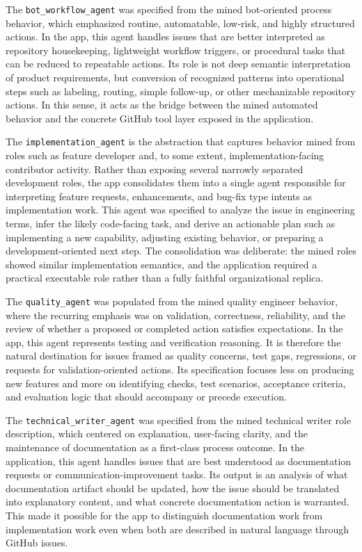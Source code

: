 \documentclass[11pt,a4paper]{article}
\begin{document}
The \texttt{bot\_workflow\_agent} was specified from the mined bot-oriented process behavior, which emphasized routine, automatable, low-risk, and highly structured actions. In the app, this agent handles issues that are better interpreted as repository housekeeping, lightweight workflow triggers, or procedural tasks that can be reduced to repeatable actions. Its role is not deep semantic interpretation of product requirements, but conversion of recognized patterns into operational steps such as labeling, routing, simple follow-up, or other mechanizable repository actions. In this sense, it acts as the bridge between the mined automated behavior and the concrete GitHub tool layer exposed in the application.

The \texttt{implementation\_agent} is the abstraction that captures behavior mined from roles such as feature developer and, to some extent, implementation-facing contributor activity. Rather than exposing several narrowly separated development roles, the app consolidates them into a single agent responsible for interpreting feature requests, enhancements, and bug-fix type intents as implementation work. This agent was specified to analyze the issue in engineering terms, infer the likely code-facing task, and derive an actionable plan such as implementing a new capability, adjusting existing behavior, or preparing a development-oriented next step. The consolidation was deliberate: the mined roles showed similar implementation semantics, and the application required a practical executable role rather than a fully faithful organizational replica.

The \texttt{quality\_agent} was populated from the mined quality engineer behavior, where the recurring emphasis was on validation, correctness, reliability, and the review of whether a proposed or completed action satisfies expectations. In the app, this agent represents testing and verification reasoning. It is therefore the natural destination for issues framed as quality concerns, test gaps, regressions, or requests for validation-oriented actions. Its specification focuses less on producing new features and more on identifying checks, test scenarios, acceptance criteria, and evaluation logic that should accompany or precede execution.

The \texttt{technical\_writer\_agent} was specified from the mined technical writer role description, which centered on explanation, user-facing clarity, and the maintenance of documentation as a first-class process outcome. In the application, this agent handles issues that are best understood as documentation requests or communication-improvement tasks. Its output is an analysis of what documentation artifact should be updated, how the issue should be translated into explanatory content, and what concrete documentation action is warranted. This made it possible for the app to distinguish documentation work from implementation work even when both are described in natural language through GitHub issues.
\end{document}
